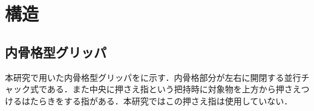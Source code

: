 \section{構造}
\subsection{内骨格型グリッパ}
本研究で用いた内骨格型グリッパをに示す．内骨格部分が左右に開閉する並行チャック式である．また中央に押さえ指という把持時に対象物を上方から押さえつけるはたらきをする指がある．本研究ではこの押さえ指は使用していない．

\begin{figure}[h]
\centering
{}
\hspace{5mm}

\end{figure}
